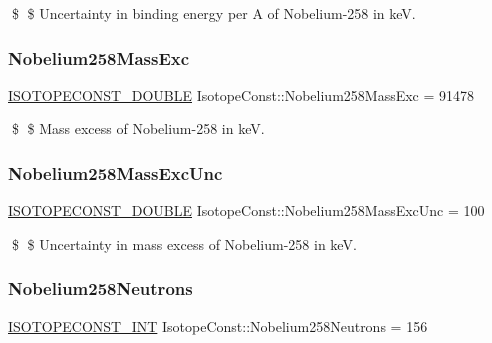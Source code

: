 \$ \$ Uncertainty in binding energy per A of Nobelium-\/258 in keV. \mbox{\label{group___isotope_const-_nobelium-_no258_gab9e81c033a1d6a486502d9a0ce7f83fc}} 
\subsubsection{\texorpdfstring{Nobelium258\+Mass\+Exc}{Nobelium258MassExc}}
{\footnotesize\ttfamily \mbox{\hyperlink{group___isotope_const-_macros_ga8f45a7272ce02c0b4c65c44636ed719a}{I\+S\+O\+T\+O\+P\+E\+C\+O\+N\+S\+T\+\_\+\+D\+O\+U\+B\+LE}} Isotope\+Const\+::\+Nobelium258\+Mass\+Exc = 91478}

\$ \$ Mass excess of Nobelium-\/258 in keV. \mbox{\label{group___isotope_const-_nobelium-_no258_ga2b2a978990df0bf4cbdda7db4fa207a9}} 
\subsubsection{\texorpdfstring{Nobelium258\+Mass\+Exc\+Unc}{Nobelium258MassExcUnc}}
{\footnotesize\ttfamily \mbox{\hyperlink{group___isotope_const-_macros_ga8f45a7272ce02c0b4c65c44636ed719a}{I\+S\+O\+T\+O\+P\+E\+C\+O\+N\+S\+T\+\_\+\+D\+O\+U\+B\+LE}} Isotope\+Const\+::\+Nobelium258\+Mass\+Exc\+Unc = 100}

\$ \$ Uncertainty in mass excess of Nobelium-\/258 in keV. \mbox{\label{group___isotope_const-_nobelium-_no258_ga8ce3cebcd6eec9a56b221acb575952f3}} 
\subsubsection{\texorpdfstring{Nobelium258\+Neutrons}{Nobelium258Neutrons}}
{\footnotesize\ttfamily \mbox{\hyperlink{group___isotope_const-_macros_ga5f18360b3e99483a35c32d789e62621c}{I\+S\+O\+T\+O\+P\+E\+C\+O\+N\+S\+T\+\_\+\+I\+NT}} Isotope\+Const\+::\+Nobelium258\+Neutrons = 156}

